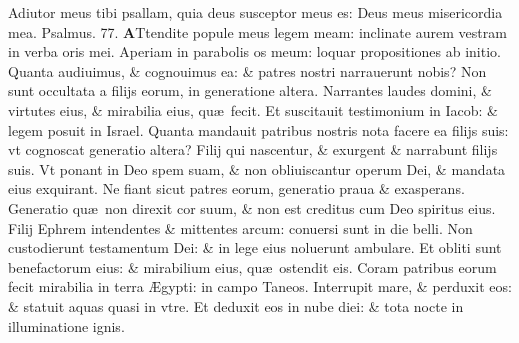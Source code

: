 \documentclass[a5paper,10pt]{book}
\def\ae{æ}
\def\AE{Æ}
\begin{document}
\begin{multicols*}{2}
\newline \color{red} A\color{black}diutor meus tibi psallam, quia deus susceptor meus es: Deus meus misericordia mea. \quad \color{red} Psalmus. \hypertarget{ps77}{77.} \color{black}
\vspace{-.5em}
\lettrine[lines=2]{\bfseries \color{red} A}{}Ttendite popule meus legem meam: inclinate aurem vestram in verba oris mei.
\newline \color{red} A\color{black}periam in parabolis os meum: loquar propositiones ab initio.
\newline \color{red} Q\color{black}uanta audiuimus, \& cognouimus ea: \& patres nostri narrauerunt nobis?
\newline \color{red} N\color{black}on sunt occultata a filijs eorum, in generatione altera.
\newline \color{red} N\color{black}arrantes laudes domini, \& virtutes eius, \& mirabilia eius, qu\ae \ fecit.
\newline \color{red} E\color{black}t suscitauit testimonium in Iacob: \& legem posuit in Israel.
\newline \color{red} Q\color{black}uanta mandauit patribus nostris nota facere ea filijs suis: vt cognoscat generatio altera?
\newline \color{red} F\color{black}ilij qui nascentur, \& exurgent \& narrabunt filijs suis.
\newline \color{red} V\color{black}t ponant in Deo spem suam, \& non obliuiscantur operum Dei, \& mandata eius exquirant.
\newline \color{red} N\color{black}e fiant sicut patres eorum, generatio praua \& exasperans.
\newline \color{red} G\color{black}eneratio qu\ae \ non direxit cor suum, \& non est creditus cum Deo spiritus eius.
\newline \color{red} F\color{black}ilij Ephrem intendentes \& mittentes arcum: conuersi sunt in die belli.
\newline \color{red} N\color{black}on custodierunt testamentum Dei: \& in lege eius noluerunt ambulare.
\newline \color{red} E\color{black}t obliti sunt benefactorum eius: \& mirabilium eius, qu\ae \ ostendit eis.
\newline \color{red} C\color{black}oram patribus eorum fecit mirabilia in terra \AE gypti: in campo Taneos.
\newline \color{red} I\color{black}nterrupit mare, \& perduxit eos: \& statuit aquas quasi in vtre.
\newline \color{red} E\color{black}t deduxit eos in nube diei: \& tota nocte in illuminatione ignis.

\end{multicols*}
\end{document}
